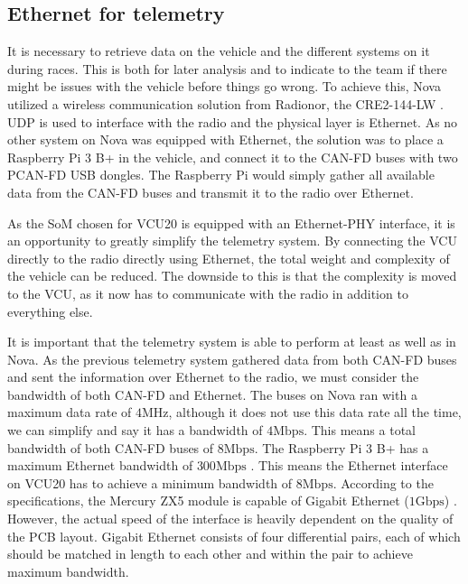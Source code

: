 

\subsection{Ethernet for telemetry}

It is necessary to retrieve data on the vehicle and the different systems on it during races. This is both for later analysis and to indicate to the team if there might be issues with the vehicle before things go wrong. To achieve this, Nova utilized a wireless communication solution from Radionor, the CRE2-144-LW \cite{radionor}. UDP is used to interface with the radio and the physical layer is Ethernet. As no other system on Nova was equipped with Ethernet, the solution was to place a Raspberry Pi 3 B+ in the vehicle, and connect it to the CAN-FD buses with two PCAN-FD USB dongles. The Raspberry Pi would simply gather all available data from the CAN-FD buses and transmit it to the radio over Ethernet. 

As the SoM chosen for VCU20 is equipped with an Ethernet-PHY interface, it is an opportunity to greatly simplify the telemetry system. By connecting the VCU directly to the radio directly using Ethernet, the total weight and complexity of the vehicle can be reduced. The downside to this is that the complexity is moved to the VCU, as it now has to communicate with the radio in addition to everything else. 

It is important that the telemetry system is able to perform at least as well as in Nova. As the previous telemetry system gathered data from both CAN-FD buses and sent the information over Ethernet to the radio, we must consider the bandwidth of both CAN-FD and Ethernet. The buses on Nova ran with a maximum data rate of $4\si{\mega\hertz}$, although it does not use this data rate all the time, we can simplify and say it has a bandwidth of $4\textrm{Mbps}$. This means a total bandwidth of both CAN-FD buses of $8\textrm{Mbps}$. The Raspberry Pi 3 B+ has a maximum Ethernet bandwidth of $300\textrm{Mbps}$ \cite{rpi}. This means the Ethernet interface on VCU20 has to achieve a minimum bandwidth of $8\textrm{Mbps}$. According to the specifications, the Mercury ZX5 module is capable of Gigabit Ethernet ($1 \textrm{Gbps}$) \cite{zx5}. However, the actual speed of the interface is heavily dependent on the quality of the PCB layout. Gigabit Ethernet consists of four differential pairs, each of which should be matched in length to each other and within the pair to achieve maximum bandwidth.



